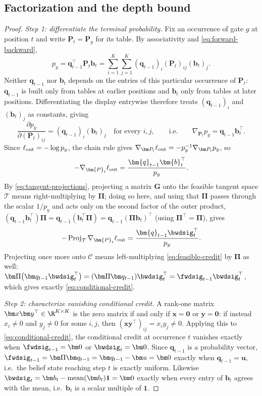 \subsection{Factorization and the depth bound}
\label{app:factorization-proof}

\begin{proof}
\emph{Step 1: differentiate the terminal probability.}
Fix an occurrence of gate $g$ at position $t$ and write $\bm P_t=\bm P_g$ for
its table. By associativity and \cref{eq:forward-backward},
\[
 p_y=\bm{q}_{t-1}^{\top}\bm{P}_t\bm{b}_t=\sum_{i=1}^K\sum_{j=1}^K(\bm q_{t-1})_i(\bm P_t)_{ij}(\bm b_t)_j.
\]
Neither $\bm q_{t-1}$ nor $\bm b_t$ depends on the entries of this particular
occurrence of $\bm P_t$: $\bm q_{t-1}$ is built only from tables at earlier
positions and $\bm b_t$ only from tables at later positions. Differentiating
the display entrywise therefore treats $(\bm q_{t-1})_i$ and $(\bm b_t)_j$ as
constants, giving
\[
 \frac{\partial p_y}{\partial(\bm{P}_t)_{ij}}
 =(\bm{q}_{t-1})_i(\bm{b}_t)_j
 \quad\text{for every }i,j,
 \qquad\text{i.e.}\qquad
 \nabla_{\bm P_t}p_y=\bm q_{t-1}\bm b_t^\top.
\]
Since $\ell_{\rm out}=-\log p_y$, the chain rule gives
$\nabla_{\bm P_t}\ell_{\rm out}=-p_y^{-1}\nabla_{\bm P_t}p_y$, so
\[
 -\nabla_{\bm{P}_t}\ell_{\rm out}
 =\frac{\bm{q}_{t-1}\bm{b}_t^\top}{p_y}.
\]
By \cref{eq:tangent-projections}, projecting a matrix $\bm G$ onto the
feasible tangent space $\mathcal T$ means right-multiplying by $\bm\Pi$; doing
so here, and using that $\bm\Pi$ passes through the scalar $1/p_y$ and acts
only on the second factor of the outer product, $(\bm q_{t-1}\bm b_t^\top)\bm\Pi=\bm q_{t-1}(\bm b_t^\top\bm\Pi)=\bm q_{t-1}(\bm\Pi\bm b_t)^\top$
(using $\bm\Pi^\top=\bm\Pi$), gives
\begin{equation}
 -\operatorname{Proj}_{\mathcal T}\nabla_{\bm{P}_t}\ell_{\rm out}
 =\frac{\bm{q}_{t-1}\bwdsig_t^{\top}}{p_y}.
 \label{eq:feasible-credit}
\end{equation}
Projecting once more onto $\mathcal C$ means left-multiplying \cref{eq:feasible-credit}
by $\bm\Pi$ as well: $\bm\Pi\bigl(\bm q_{t-1}\bwdsig_t^\top\bigr)=(\bm\Pi\bm q_{t-1})\bwdsig_t^\top=\fwdsig_{t-1}\bwdsig_t^\top$,
which gives exactly \cref{eq:conditional-credit}.

\emph{Step 2: characterize vanishing conditional credit.}
A rank-one matrix $\bm x\bm y^\top\in\R^{K\times K}$ is the zero matrix if and
only if $\bm x=\bm0$ or $\bm y=\bm0$: if instead $x_i\ne0$ and $y_j\ne0$ for
some $i,j$, then $(\bm x\bm y^\top)_{ij}=x_iy_j\ne0$. Applying this to
\cref{eq:conditional-credit}, the conditional credit at occurrence $t$
vanishes exactly when $\fwdsig_{t-1}=\bm0$ or $\bwdsig_t=\bm0$. Since
$\bm q_{t-1}$ is a probability vector, $\fwdsig_{t-1}=\bm\Pi\bm q_{t-1}=\bm q_{t-1}-\bm u=\bm0$
exactly when $\bm q_{t-1}=\bm u$, i.e.\ the belief state reaching step $t$ is
exactly uniform. Likewise $\bwdsig_t=\bm b_t-\operatorname{mean}(\bm b_t)\mathbf1=\bm0$
exactly when every entry of $\bm b_t$ agrees with the mean, i.e.\ $\bm b_t$ is
a scalar multiple of $\mathbf1$.


\end{proof}
